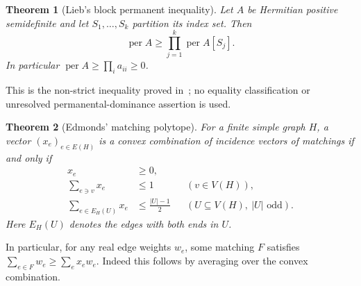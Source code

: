 \documentclass[11pt]{article}
\newtheorem{theorem}{Theorem}[section]
\theoremstyle{remark}\newtheorem{remark}[theorem]{Remark}
\DeclareMathOperator{\per}{per}
\begin{document}
\begin{theorem}[Lieb's block permanent inequality]\label{thm:lieb}
Let $A$ be Hermitian positive semidefinite and let $S_1,\ldots,S_k$
partition its index set. Then
\[
\per A\ge\prod_{j=1}^k\per A[S_j].
\]
In particular $\per A\ge\prod_i a_{ii}\ge0$.
\end{theorem}
This is the non-strict inequality proved in~\cite{Lieb}; no equality
classification or unresolved permanental-dominance assertion is used.

\begin{theorem}[Edmonds' matching polytope]\label{thm:edmonds}
For a finite simple graph $H$, a vector $(x_e)_{e\in E(H)}$ is a convex
combination of incidence vectors of matchings if and only if
\begin{align*}
x_e&\ge0,\\
\sum_{e\ni v}x_e&\le1 &&(v\in V(H)),\\
\sum_{e\in E_H(U)}x_e&\le\frac{|U|-1}{2}
&& (U\subseteq V(H),\ |U|\text{ odd}).
\end{align*}
Here $E_H(U)$ denotes the edges with both ends in $U$.
\end{theorem}
In particular, for any real edge weights $w_e$, some matching $F$
satisfies $\sum_{e\in F}w_e\ge\sum_e x_e w_e$.
Indeed this follows by averaging over the convex combination.
\end{document}
